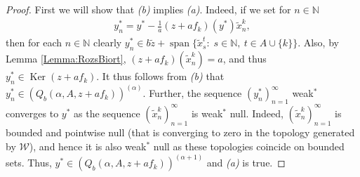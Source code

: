 \documentclass{amsart}
\theoremstyle{definition}
\begin{document}
\begin{proof}
    First we will show that \textit{(b)} implies \textit{(a)}. Indeed, if we set for $n \in \mathbb{N}$
    \begin{align*}
        y_n^* = y^* - \frac{1}{a} (z+af_k)(y^*) \widetilde{x}^k_n,
    \end{align*}
    then for each $n \in \mathbb{N}$ clearly $y_n^* \in b \widetilde{z} + \operatorname{span} \{\widetilde{x}^t_s: \; s \in \mathbb{N}, \: t \in A \cup \{k\}\}$. Also, by Lemma \ref{Lemma:RozsBiort}, $(z+af_k)(\widetilde{x}^k_n) = a$, and thus $y_n^* \in \operatorname{Ker}(z + af_k)$. It thus follows from \textit{(b)} that $y_n^* \in \left( Q_b(\alpha,A,z+af_k) \right)^{(\alpha)}$. Further, the sequence $(y_n^*)_{n=1}^\infty$ weak$^*$ converges to $y^*$ as the sequence $(\widetilde{x}^k_n)_{n=1}^\infty$ is weak$^*$ null. Indeed, $(\widetilde{x}^k_n)_{n=1}^\infty$ is bounded and pointwise null (that is converging to zero in the topology generated by $\mathcal{W}$), and hence it is also weak$^*$ null as these topologies coincide on bounded sets. Thus, $y^* \in \left( Q_b(\alpha,A,z+af_k) \right)^{(\alpha+1)}$ and \textit{(a)} is true.
    

\end{proof}
\end{document}
